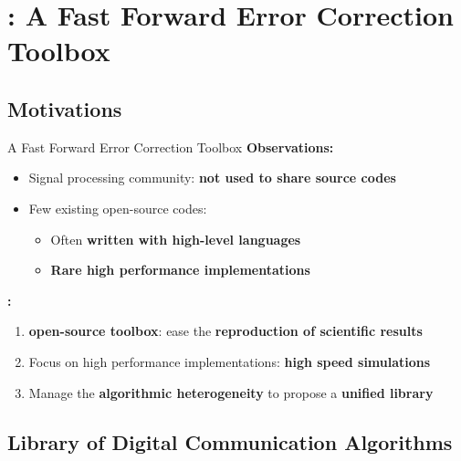 
\section[\AFFECT]{\AFFECT: A Fast Forward Error Correction Toolbox}

\subsection[Motivations]{Motivations}

\begin{frame}{A Fast Forward Error Correction Toolbox}
  \vfill
  \textbf{Observations:}

  \vspace{0.1cm}
  \begin{itemize}
    \item Signal processing community: \textbf{not used to share source codes}
    \item Few existing open-source codes:
    \begin{itemize}
      \item Often \textbf{written with high-level languages}
      \item \textbf{Rare high performance implementations}
    \end{itemize}
  \end{itemize}

  \vfill
  \pause
  \textbf{\AFFECT:}

  \vspace{0.1cm}
  \begin{enumerate}
    \item \Cxx \textbf{open-source toolbox}: ease the \textbf{reproduction of scientific results}
    \pause
    \item Focus on high performance implementations: \textbf{high speed simulations}
    \pause
    \item Manage the \textbf{algorithmic heterogeneity} to propose a \textbf{unified library}
  \end{enumerate}
  \vfill
\end{frame}

\subsection[Library of Digital Communication Algorithms]{Library of Digital Communication Algorithms}

